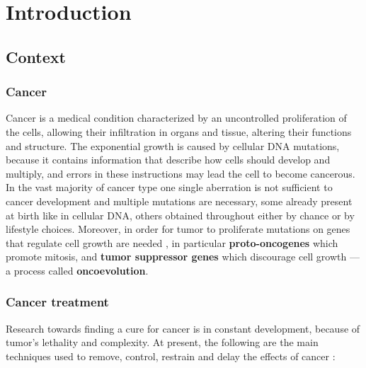 \chapter{Introduction} \label{chap:introduction}

\section{Context}

\subsection{Cancer}

Cancer is a medical condition characterized by an uncontrolled proliferation of the cells, allowing their infiltration in organs and tissue, altering their functions and structure. The exponential growth is caused by cellular DNA mutations, because it contains information that describe how cells should develop and multiply, and errors in these instructions may lead the cell to become cancerous. In the vast majority of cancer type one single aberration is not sufficient to cancer development and multiple mutations are necessary, some already present at birth like in cellular DNA, others obtained throughout either by chance or by lifestyle choices. Moreover, in order for tumor to proliferate mutations on genes that regulate cell growth are needed \cite{Vogelstein2004}, in particular \textbf{proto-oncogenes} which promote mitosis, and \textbf{tumor suppressor genes} which discourage cell growth --- a process called \textbf{oncoevolution}. 

\subsection{Cancer treatment}

Research towards finding a cure for cancer is in constant development, because of tumor's lethality and complexity. At present, the following are the main techniques used to remove, control, restrain and delay the effects of cancer \cite{cancer_treat}:

